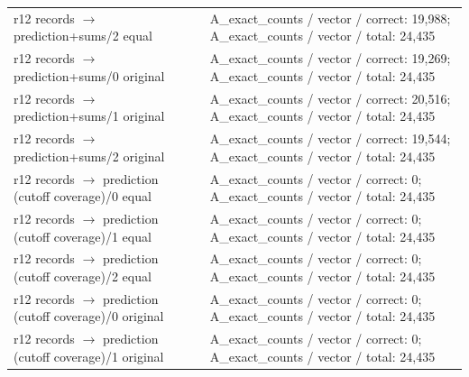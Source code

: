 \begin{longtable}{@{}>{\raggedright\arraybackslash}p{1.800in}>{\raggedright\arraybackslash}p{4.200in}@{}}
r12 records $\to$ prediction+sums/\allowbreak{}2 equal & A\_\allowbreak{}exact\_\allowbreak{}counts /\allowbreak{} vector /\allowbreak{} correct: 19,988; A\_\allowbreak{}exact\_\allowbreak{}counts /\allowbreak{} vector /\allowbreak{} total: 24,435 \\
r12 records $\to$ prediction+sums/\allowbreak{}0 original & A\_\allowbreak{}exact\_\allowbreak{}counts /\allowbreak{} vector /\allowbreak{} correct: 19,269; A\_\allowbreak{}exact\_\allowbreak{}counts /\allowbreak{} vector /\allowbreak{} total: 24,435 \\
r12 records $\to$ prediction+sums/\allowbreak{}1 original & A\_\allowbreak{}exact\_\allowbreak{}counts /\allowbreak{} vector /\allowbreak{} correct: 20,516; A\_\allowbreak{}exact\_\allowbreak{}counts /\allowbreak{} vector /\allowbreak{} total: 24,435 \\
r12 records $\to$ prediction+sums/\allowbreak{}2 original & A\_\allowbreak{}exact\_\allowbreak{}counts /\allowbreak{} vector /\allowbreak{} correct: 19,544; A\_\allowbreak{}exact\_\allowbreak{}counts /\allowbreak{} vector /\allowbreak{} total: 24,435 \\
r12 records $\to$ prediction (cutoff coverage)/\allowbreak{}0 equal & A\_\allowbreak{}exact\_\allowbreak{}counts /\allowbreak{} vector /\allowbreak{} correct: 0; A\_\allowbreak{}exact\_\allowbreak{}counts /\allowbreak{} vector /\allowbreak{} total: 24,435 \\
r12 records $\to$ prediction (cutoff coverage)/\allowbreak{}1 equal & A\_\allowbreak{}exact\_\allowbreak{}counts /\allowbreak{} vector /\allowbreak{} correct: 0; A\_\allowbreak{}exact\_\allowbreak{}counts /\allowbreak{} vector /\allowbreak{} total: 24,435 \\
r12 records $\to$ prediction (cutoff coverage)/\allowbreak{}2 equal & A\_\allowbreak{}exact\_\allowbreak{}counts /\allowbreak{} vector /\allowbreak{} correct: 0; A\_\allowbreak{}exact\_\allowbreak{}counts /\allowbreak{} vector /\allowbreak{} total: 24,435 \\
r12 records $\to$ prediction (cutoff coverage)/\allowbreak{}0 original & A\_\allowbreak{}exact\_\allowbreak{}counts /\allowbreak{} vector /\allowbreak{} correct: 0; A\_\allowbreak{}exact\_\allowbreak{}counts /\allowbreak{} vector /\allowbreak{} total: 24,435 \\
r12 records $\to$ prediction (cutoff coverage)/\allowbreak{}1 original & A\_\allowbreak{}exact\_\allowbreak{}counts /\allowbreak{} vector /\allowbreak{} correct: 0; A\_\allowbreak{}exact\_\allowbreak{}counts /\allowbreak{} vector /\allowbreak{} total: 24,435 \\

\end{longtable}
